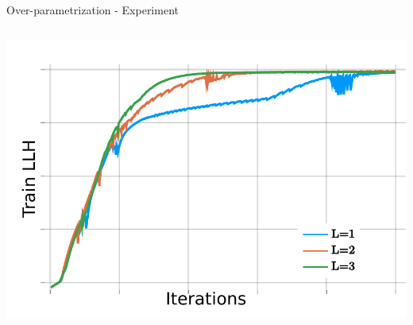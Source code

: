 \iffalse
\begin{frame}{Over-parametrization - Experiment}
\begin{columns}
\begin{column}{\linewidth}
\includegraphics[width=\textwidth]{nltcs_experiment}
\end{column}
\end{columns}
\end{frame}

